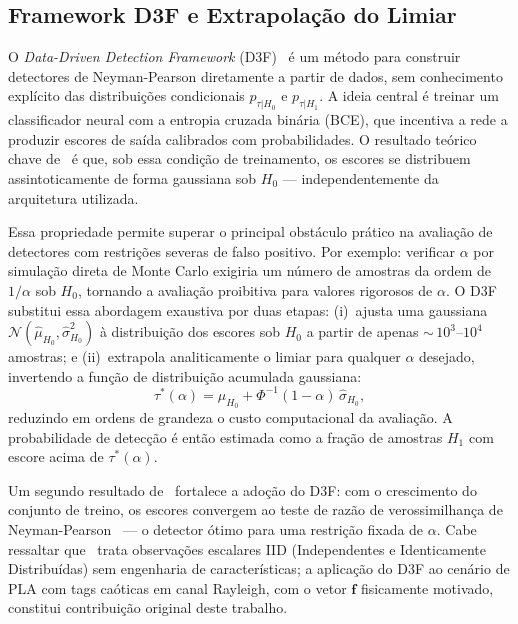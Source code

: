 \documentclass{sbrt}
\begin{document}
\subsection{Framework D3F e Extrapolação do Limiar}\label{sec:d3f}

O \textit{Data-Driven Detection Framework} (D3F)~\cite{ref_braca} é um método para construir detectores de Neyman-Pearson diretamente a partir de dados, sem conhecimento explícito das distribuições condicionais $p_{\tau|H_0}$ e $p_{\tau|H_1}$. A ideia central é treinar um classificador neural com a entropia cruzada binária (BCE), que incentiva a rede a produzir escores de saída calibrados com probabilidades. O resultado teórico chave de~\cite{ref_braca} é que, sob essa condição de treinamento, os escores se distribuem assintoticamente de forma gaussiana sob $H_0$ — independentemente da arquitetura utilizada.

Essa propriedade permite superar o principal obstáculo prático na avaliação de detectores com restrições severas de falso positivo. Por exemplo: verificar $\alpha$ por simulação direta de Monte Carlo exigiria um número de amostras da ordem de $1/\alpha$ sob $H_0$, tornando a avaliação proibitiva para valores rigorosos de $\alpha$. O D3F substitui essa abordagem exaustiva por duas etapas: (i)~ajusta uma gaussiana $\mathcal{N}(\hat{\mu}_{H_0}, \hat{\sigma}_{H_0}^2)$ à distribuição dos escores sob $H_0$ a partir de apenas ${\sim}\,10^3$--$10^4$ amostras; e (ii)~extrapola analiticamente o limiar para qualquer $\alpha$ desejado, invertendo a função de distribuição acumulada gaussiana:
\begin{equation}\label{eq:d3f}
    \tau^*(\alpha) = \hat{\mu}_{H_0} + \Phi^{-1}(1-\alpha)\,\hat{\sigma}_{H_0},
\end{equation}
reduzindo em ordens de grandeza o custo computacional da avaliação. A probabilidade de detecção é então estimada como a fração de amostras $H_1$ com escore acima de $\tau^*(\alpha)$.

Um segundo resultado de~\cite{ref_braca} fortalece a adoção do D3F: com o crescimento do conjunto de treino, os escores convergem ao teste de razão de verossimilhança de Neyman-Pearson~\cite{ref_poor,ref_veldhuis} — o detector ótimo para uma restrição fixada de $\alpha$. Cabe ressaltar que~\cite{ref_braca} trata observações escalares IID (Independentes e Identicamente Distribuídas) sem engenharia de características; a aplicação do D3F ao cenário de PLA com tags caóticas em canal Rayleigh, com o vetor $\mathbf{f}$ fisicamente motivado, constitui contribuição original deste trabalho.
\end{document}
